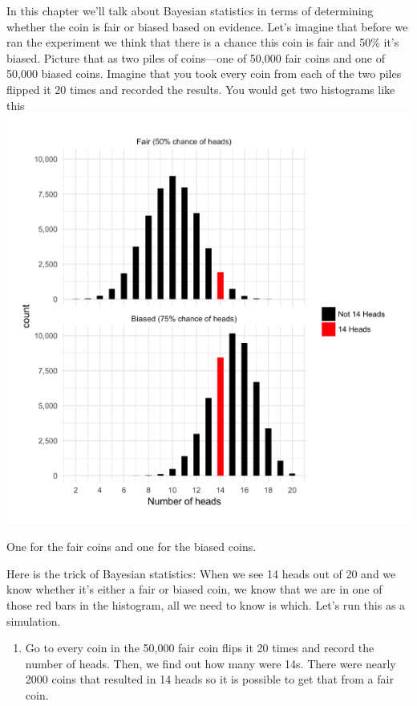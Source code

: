\documentclass[]{article}
\providecommand{\tightlist}{%
  \setlength{\itemsep}{0pt}\setlength{\parskip}{0pt}}
\begin{document}
In this chapter we'll talk about Bayesian statistics in terms of
determining whether the coin is fair or biased based on evidence. Let's
imagine that before we ran the experiment we think that there is a
chance this coin is fair and 50\% it's biased. Picture that as two piles
of coins---one of 50,000 fair coins and one of 50,000 biased coins.
Imagine that you took every coin from each of the two piles flipped it
20 times and recorded the results. You would get two histograms like
this
\includegraphics{image-lib/a_distribution_of_fair_and_biased_coins.png}

One for the fair coins and one for the biased coins.

Here is the trick of Bayesian statistics: When we see 14 heads out of 20
and we know whether it's either a fair or biased coin, we know that we
are in one of those red bars in the histogram, all we need to know is
which. Let's run this as a simulation.

\begin{enumerate}
\def\labelenumi{\arabic{enumi}.}
\tightlist
\item
  Go to every coin in the 50,000 fair coin flips it 20 times and record
  the number of heads. Then, we find out how many were 14s. There were
  nearly 2000 coins that resulted in 14 heads so it is possible to get
  that from a fair coin.
\end{enumerate}
\end{document}
